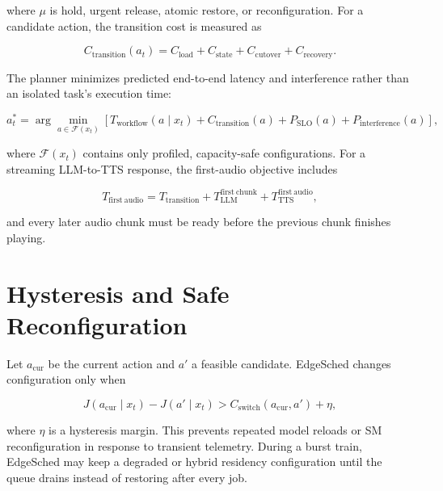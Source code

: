 \documentclass[10pt]{article}
\begin{document}
where $\mu$ is hold, urgent release, atomic restore, or reconfiguration.  For a
candidate action, the transition cost is measured as

\begin{equation}
C_{\mathrm{transition}}(a_t)=
C_{\mathrm{load}}+C_{\mathrm{state}}+C_{\mathrm{cutover}}+C_{\mathrm{recovery}}.
\end{equation}

The planner minimizes predicted end-to-end latency and interference rather than
an isolated task's execution time:

\begin{equation}
a_t^*=\arg\min_{a\in\mathcal F(x_t)}
\left[
T_{\mathrm{workflow}}(a\mid x_t)
+C_{\mathrm{transition}}(a)
+P_{\mathrm{SLO}}(a)
+P_{\mathrm{interference}}(a)
\right],
\end{equation}

where $\mathcal F(x_t)$ contains only profiled, capacity-safe configurations.
For a streaming LLM-to-TTS response, the first-audio objective includes

\begin{equation}
T_{\mathrm{first\ audio}}=
T_{\mathrm{transition}}
+T_{\mathrm{LLM}}^{\mathrm{first\ chunk}}
+T_{\mathrm{TTS}}^{\mathrm{first\ audio}},
\end{equation}

and every later audio chunk must be ready before the previous chunk finishes
playing.

\section*{Hysteresis and Safe Reconfiguration}

Let $a_{\mathrm{cur}}$ be the current action and $a'$ a feasible candidate.
EdgeSched changes configuration only when

\begin{equation}
J(a_{\mathrm{cur}}\mid x_t)-J(a'\mid x_t)
> C_{\mathrm{switch}}(a_{\mathrm{cur}},a')+\eta ,
\end{equation}

where $\eta$ is a hysteresis margin.  This prevents repeated model reloads or SM
reconfiguration in response to transient telemetry.  During a burst train,
EdgeSched may keep a degraded or hybrid residency configuration until the queue
drains instead of restoring after every job.
\end{document}
